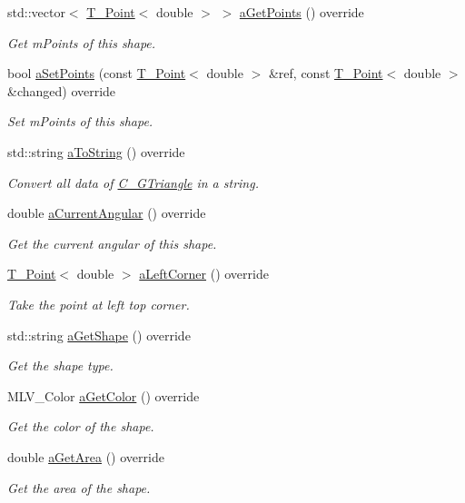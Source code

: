 \begin{DoxyCompactItemize}
std\+::vector$<$ \hyperlink{classT__Point}{T\+\_\+\+Point}$<$ double $>$ $>$ \hyperlink{classC__GTriangle_af3c514a6f5516c297374004a94788877}{a\+Get\+Points} () override
\begin{DoxyCompactList}\small\item\em Get m\+Points of this shape. \end{DoxyCompactList}\item 
bool \hyperlink{classC__GTriangle_a18c134ddf90bc4f5729064a47094068b}{a\+Set\+Points} (const \hyperlink{classT__Point}{T\+\_\+\+Point}$<$ double $>$ \&ref, const \hyperlink{classT__Point}{T\+\_\+\+Point}$<$ double $>$ \&changed) override
\begin{DoxyCompactList}\small\item\em Set m\+Points of this shape. \end{DoxyCompactList}\item 
std\+::string \hyperlink{classC__GTriangle_aa432e8b8320db8a53ef1d59b486ed7ce}{a\+To\+String} () override
\begin{DoxyCompactList}\small\item\em Convert all data of \hyperlink{classC__GTriangle}{C\+\_\+\+G\+Triangle} in a string. \end{DoxyCompactList}\item 
double \hyperlink{classC__GTriangle_a98866648972bb78707c61aa7ebc22fb9}{a\+Current\+Angular} () override
\begin{DoxyCompactList}\small\item\em Get the current angular of this shape. \end{DoxyCompactList}\item 
\hyperlink{classT__Point}{T\+\_\+\+Point}$<$ double $>$ \hyperlink{classC__GTriangle_a57943afaad0f6b7c3c13aa35a233e93b}{a\+Left\+Corner} () override
\begin{DoxyCompactList}\small\item\em Take the point at left top corner. \end{DoxyCompactList}\item 
std\+::string \hyperlink{classC__GTriangle_a039e79bb17dae01997b11243de457d98}{a\+Get\+Shape} () override
\begin{DoxyCompactList}\small\item\em Get the shape type. \end{DoxyCompactList}\item 
M\+L\+V\+\_\+\+Color \hyperlink{classC__GTriangle_a19100d603f9239fd66f1115c4358f0fc}{a\+Get\+Color} () override
\begin{DoxyCompactList}\small\item\em Get the color of the shape. \end{DoxyCompactList}\item 
double \hyperlink{classC__GTriangle_a4d1c9a050aef86a7eab973b1fe668544}{a\+Get\+Area} () override
\begin{DoxyCompactList}\small\item\em Get the area of the shape. \end{DoxyCompactList}\end{DoxyCompactItemize}
